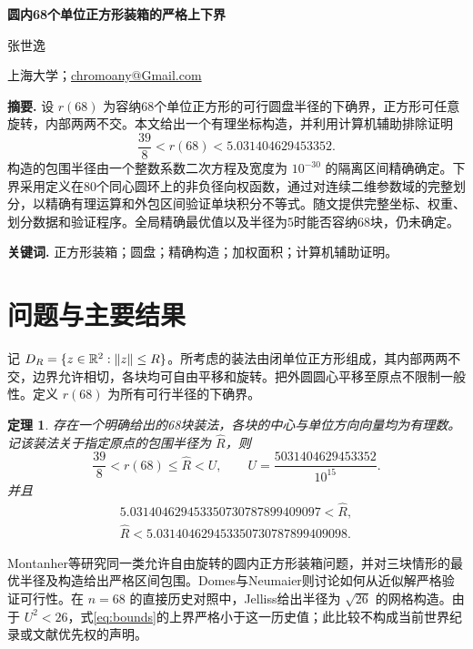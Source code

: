 \documentclass[11pt]{article}
\newtheorem{theorem}{定理}
\begin{document}
\begin{center}
{\fontsize{14}{17}\selectfont\bfseries 圆内68个单位正方形装箱的严格上下界\par}
\vspace{7pt}
{\fontsize{12}{14}\selectfont 张世逸\par}
\vspace{3pt}
上海大学；\href{mailto:chromoany@Gmail.com}{chromoany@Gmail.com}
\end{center}
\vspace{5pt}
\noindent\textbf{摘要.}
设 $r(68)$ 为容纳68个单位正方形的可行圆盘半径的下确界，正方形可任意旋转，内部两两不交。本文给出一个有理坐标构造，并利用计算机辅助排除证明
\[
\frac{39}{8}<r(68)<5.031404629453352.
\]
构造的包围半径由一个整数系数二次方程及宽度为 $10^{-30}$ 的隔离区间精确确定。下界采用定义在80个同心圆环上的非负径向权函数，通过对连续二维参数域的完整划分，以精确有理运算和外包区间验证单块积分不等式。随文提供完整坐标、权重、划分数据和验证程序。全局精确最优值以及半径为5时能否容纳68块，仍未确定。

\medskip
\noindent\textbf{关键词.} 正方形装箱；圆盘；精确构造；加权面积；计算机辅助证明。

\section{问题与主要结果}
记 $D_R=\{z\in\mathbb R^2:\|z\|\le R\}$。所考虑的装法由闭单位正方形组成，其内部两两不交，边界允许相切，各块均可自由平移和旋转。把外圆圆心平移至原点不限制一般性。定义 $r(68)$ 为所有可行半径的下确界。

\begin{theorem}\label{thm:main}
存在一个明确给出的68块装法，各块的中心与单位方向向量均为有理数。记该装法关于指定原点的包围半径为 $\widehat R$，则
\begin{equation}\label{eq:bounds}
\frac{39}{8}<r(68)\le\widehat R<U,
\qquad U=\frac{5031404629453352}{10^{15}}.
\end{equation}
并且
\begin{equation}\label{eq:isolation}
\begin{gathered}
5.031404629453350730787899409097
<\widehat R,\\
\widehat R<5.031404629453350730787899409098.
\end{gathered}
\end{equation}
\end{theorem}

Montanher等\cite{montanher}研究同一类允许自由旋转的圆内正方形装箱问题，并对三块情形的最优半径及构造给出严格区间包围。Domes与Neumaier\cite{domes}则讨论如何从近似解严格验证可行性。在 $n=68$ 的直接历史对照中，Jelliss\cite{jelliss}给出半径为 $\sqrt{26}$ 的网格构造。由于 $U^2<26$，式\eqref{eq:bounds}的上界严格小于这一历史值；此比较不构成当前世界纪录或文献优先权的声明。
\end{document}
